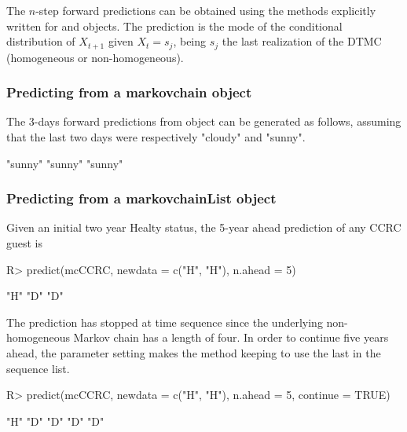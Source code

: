 \documentclass[nojss]{jss}
\begin{document}
The $n$-step forward predictions can be obtained using the  methods
explicitly written for  and  objects. 
The prediction is the mode of the conditional distribution of $X_{t+1}$ given
$X_{t}=s_{j}$, being $s_{j}$ the last realization of the DTMC (homogeneous
or non-homogeneous).

\subsubsection{Predicting from a markovchain object}

The 3-days forward predictions from  object can be generated as follows, assuming that the last two days were respectively "cloudy" and "sunny".

\begin{Schunk}
\begin{Soutput}
[1] "sunny" "sunny" "sunny"
\end{Soutput}
\end{Schunk}

\subsubsection{Predicting from a markovchainList object}

Given an initial two year Healty status, the 5-year ahead prediction of any
CCRC guest is

\begin{Schunk}
\begin{Sinput}
R> predict(mcCCRC, newdata = c("H", "H"), n.ahead = 5)
\end{Sinput}
\begin{Soutput}
[1] "H" "D" "D"
\end{Soutput}
\end{Schunk}

The prediction has stopped at time sequence since the underlying
non-homogeneous Markov chain has a length of four. In order to continue five
years ahead, the  parameter setting makes the 
method keeping to use the last  in the sequence list.


\begin{Schunk}
\begin{Sinput}
R> predict(mcCCRC, newdata = c("H", "H"), n.ahead = 5, continue = TRUE)
\end{Sinput}
\begin{Soutput}
[1] "H" "D" "D" "D" "D"
\end{Soutput}
\end{Schunk}
\end{document}
